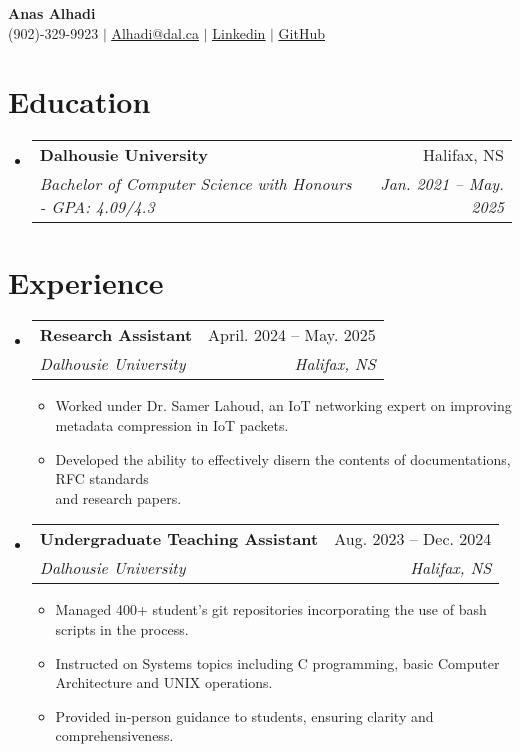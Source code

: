 \documentclass[letterpaper,11pt]{article}
\makeatletter
\newcommand{\resumeItem}[1]{
  \item\small{
    {#1 \vspace{-2pt}}
  }
}
\newcommand{\resumeSubheading}[4]{
  \vspace{-2pt}\item
    \begin{tabular*}{0.97\textwidth}[t]{l@{\extracolsep{\fill}}r}
      \textbf{#1} & #2 \\
      \textit{\small#3} & \textit{\small #4} \\
    \end{tabular*}\vspace{-7pt}
}
\newcommand{\resumeSubHeadingListStart}{\begin{itemize}[leftmargin=0.15in, label={}]}
\newcommand{\resumeSubHeadingListEnd}{\end{itemize}}
\newcommand{\resumeItemListStart}{\begin{itemize}}
\newcommand{\resumeItemListEnd}{\end{itemize}\vspace{-5pt}}
\makeatother
\begin{document}

\begin{center}
    \textbf{\Huge Anas Alhadi} \\ \vspace{1pt}
		\small (902)-329-9923 $|$ \label{contact_info}\href{mailto:Alhadi@dal.ca}{\underline{Alhadi@dal.ca}} $|$ 
    \href{https://linkedin.com/in/anas-alhadi}{\underline{Linkedin}}
$|$ 
    \href{https://github.com/pthread-me}{\underline{GitHub}}
    
\end{center}


\section{Education}
  \resumeSubHeadingListStart
    \resumeSubheading
      {Dalhousie University}{Halifax, NS}
      {Bachelor of Computer Science with Honours - GPA: 4.09/4.3}
      {Jan. 2021 -- May. 2025}
    
  \resumeSubHeadingListEnd


\section{Experience}
  \resumeSubHeadingListStart

	\resumeSubheading
      {Research Assistant}{April. 2024 -- May. 2025  }
      {Dalhousie University}{Halifax, NS}
      \resumeItemListStart
        \resumeItem{Worked under Dr. Samer Lahoud, an IoT networking expert on improving\\ metadata compression in IoT packets.}
        \resumeItem{Developed the ability to effectively disern the contents of documentations, RFC standards\\ and research papers.}
      \resumeItemListEnd 


    \resumeSubheading
		{Undergraduate Teaching Assistant}{Aug. 2023 -- Dec. 2024 }
      {Dalhousie University}{Halifax, NS}
      \resumeItemListStart
        \resumeItem{Managed 400+ student's git repositories incorporating the use of bash scripts in the process.}
        \resumeItem{Instructed on Systems topics including  C programming, basic Computer Architecture and UNIX operations.}
        \resumeItem{Provided in-person guidance to students, ensuring clarity and comprehensiveness.}
      \resumeItemListEnd 
  \resumeSubHeadingListEnd
\end{document}
